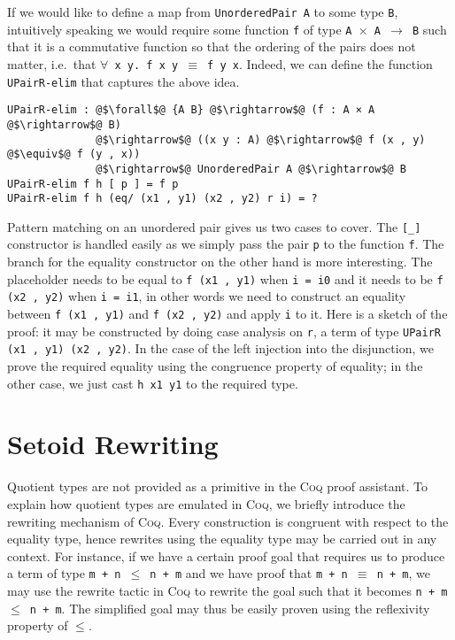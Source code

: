 \documentclass[12pt,twoside,maitrise]{dms}
\theoremstyle{definition}
\numberwithin{equation}{section}
\numberwithin{table}{chapter}
\numberwithin{figure}{chapter}
\newcommand\kw[1] {\textsf{#1}}
\newcommand\id[1] {\texttt{#1}}
\newcommand\fn[1] {\texttt{#1}}
\def\Coq{\textsc{Coq}\xspace}
\begin{document}
If we would like to define a map from \fn{UnorderedPair A} to some type \id{B},
intuitively speaking we would require some function \id{f} of type \fn{A
  $\times$ A $\rightarrow$ B} such that it is a commutative function so that the
ordering of the pairs does not matter, i.e.\ that \fn{$\forall$ x y. f x y
  $\equiv$ f y x}. Indeed, we can define the function \id{UPairR-elim} that
captures the above idea.

\begin{verbatim}
UPairR-elim : @$\forall$@ {A B} @$\rightarrow$@ (f : A × A @$\rightarrow$@ B)
              @$\rightarrow$@ ((x y : A) @$\rightarrow$@ f (x , y) @$\equiv$@ f (y , x))
              @$\rightarrow$@ UnorderedPair A @$\rightarrow$@ B
UPairR-elim f h [ p ] = f p
UPairR-elim f h (eq/ (x1 , y1) (x2 , y2) r i) = ?
\end{verbatim}

Pattern matching on an unordered pair gives us two cases to cover. The \id{[\_]}
constructor is handled easily as we simply pass the pair \id{p} to the function
\id{f}. The branch for the equality constructor on the other hand is more
interesting. The placeholder needs to be equal to \fn{f (x1 , y1)} when \fn{i =
  i0} and it needs to be \fn{f (x2 , y2)} when \fn{i = i1}, in other words we
need to construct an equality between \fn{f (x1 , y1)} and \fn{f (x2 , y2)} and
apply \id{i} to it. Here is a sketch of the proof: it may be constructed by
doing case analysis on \id{r}, a term of type \fn{UPairR (x1 , y1) (x2 , y2)}.
In the case of the left injection into the disjunction, we prove the required
equality using the congruence property of equality; in the other case, we just
cast \fn{h x1 y1} to the required type.

\section{Setoid Rewriting}

Quotient types are not provided as a primitive in the \Coq{} proof assistant. To
explain how quotient types are emulated in \Coq{}, we briefly introduce the
rewriting mechanism of \Coq{}. Every construction is congruent with respect to
the equality type, hence rewrites using the equality type may be carried out in
any context. For instance, if we have a certain proof goal that requires us to
produce a term of type \fn{m + n $\le$ n + m} and we have proof that \fn{m + n
  $\equiv$ n + m}, we may use the \kw{rewrite} tactic in \Coq{} to rewrite the
goal such that it becomes \fn{n + m $\le$ n + m}. The simplified goal may thus
be easily proven using the reflexivity property of $\le$.
\end{document}

